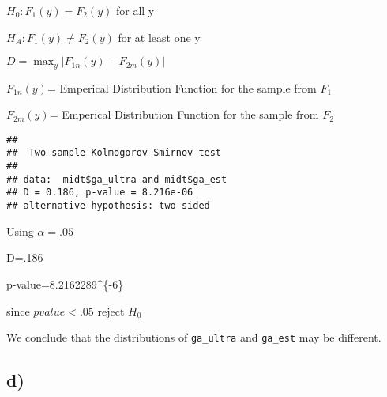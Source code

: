 \documentclass[]{article}
\newenvironment{Shaded}{\begin{snugshade}}{\end{snugshade}}
\newcommand{\KeywordTok}[1]{\textcolor[rgb]{0.13,0.29,0.53}{\textbf{#1}}}
\newcommand{\DataTypeTok}[1]{\textcolor[rgb]{0.13,0.29,0.53}{#1}}
\newcommand{\DecValTok}[1]{\textcolor[rgb]{0.00,0.00,0.81}{#1}}
\newcommand{\StringTok}[1]{\textcolor[rgb]{0.31,0.60,0.02}{#1}}
\newcommand{\OtherTok}[1]{\textcolor[rgb]{0.56,0.35,0.01}{#1}}
\newcommand{\OperatorTok}[1]{\textcolor[rgb]{0.81,0.36,0.00}{\textbf{#1}}}
\newcommand{\NormalTok}[1]{#1}
\begin{document}
\(H_0:F_1(y)=F_2(y)\) for all y

\(H_A: F_1(y)\neq F_2(y)\) for at least one y

\(D=\max_y|F_{1n}(y)-F_{2m}(y)|\)

\(F_{1n}(y)\)= Emperical Distribution Function for the sample from
\(F_1\)

\(F_{2m}(y)\)= Emperical Distribution Function for the sample from
\(F_2\)

\begin{Shaded}
\end{Shaded}

\begin{verbatim}
## 
##  Two-sample Kolmogorov-Smirnov test
## 
## data:  midt$ga_ultra and midt$ga_est
## D = 0.186, p-value = 8.216e-06
## alternative hypothesis: two-sided
\end{verbatim}

Using \(\alpha = .05\)

D=.186

p-value=8.2162289\^{}\{-6\}

since \(pvalue<.05\) reject \(H_0\)

We conclude that the distributions of \texttt{ga\_ultra} and
\texttt{ga\_est} may be different.

\subsection{d)}\label{d}

\begin{Shaded}
\end{Shaded}
\end{document}
